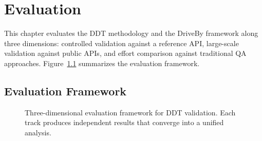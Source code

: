 \chapter{Evaluation}
\label{ch:evaluation}

This chapter evaluates the DDT methodology and the DriveBy framework along three dimensions: controlled validation against a reference API, large-scale validation against public APIs, and effort comparison against traditional QA approaches. Figure~\ref{fig:eval-methodology} summarizes the evaluation framework.

\section{Evaluation Framework}
\label{sec:eval-framework}

\begin{figure}[htbp]
\centering
\resizebox{\textwidth}{!}{%
%
}
\caption{Three-dimensional evaluation framework for DDT validation. Each track produces independent results that converge into a unified analysis.}
\label{fig:eval-methodology}
\end{figure}

